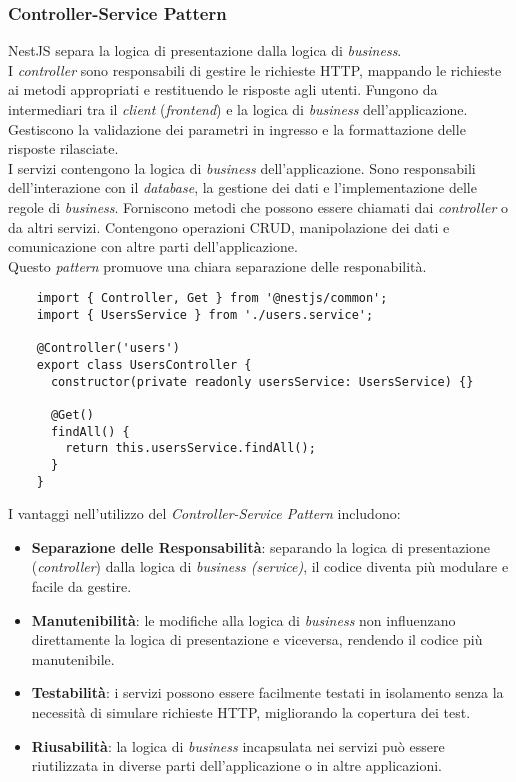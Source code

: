 \subsubsection{Controller-Service Pattern}
NestJS separa la logica di presentazione dalla logica di \textit{business}. \\
I \textit{controller} sono responsabili di gestire le richieste HTTP, mappando le richieste ai metodi appropriati e restituendo le risposte agli utenti.
Fungono da intermediari tra il \textit{client} (\textit{frontend}) e la logica di \textit{business} dell'applicazione.
Gestiscono la validazione dei parametri in ingresso e la formattazione delle risposte rilasciate.\\
I servizi contengono la logica di \textit{business} dell'applicazione. 
Sono responsabili dell'interazione con il \textit{database}, la gestione dei dati e l'implementazione delle regole di \textit{business}.
Forniscono metodi che possono essere chiamati dai \textit{controller} o da altri servizi.
Contengono operazioni CRUD, manipolazione dei dati e comunicazione con altre parti dell'applicazione.\\
Questo \textit{pattern} promuove una chiara separazione delle responabilità.
\begin{lstlisting}
	import { Controller, Get } from '@nestjs/common';
	import { UsersService } from './users.service';
	
	@Controller('users')
	export class UsersController {
	  constructor(private readonly usersService: UsersService) {}
	
	  @Get()
	  findAll() {
		return this.usersService.findAll();
	  }
	}
\end{lstlisting}
I vantaggi nell'utilizzo del \textit{Controller-Service Pattern} includono:
\begin{itemize}
	\item \textbf{Separazione delle Responsabilità}: separando la logica di presentazione (\textit{controller}) dalla logica di \textit{business (service)}, il codice diventa più modulare e facile da gestire.
	\item \textbf{Manutenibilità}: le modifiche alla logica di \textit{business} non influenzano direttamente la logica di presentazione e viceversa, rendendo il codice più manutenibile.
	\item \textbf{Testabilità}: i servizi possono essere facilmente testati in isolamento senza la necessità di simulare richieste HTTP, migliorando la copertura dei test.
	\item \textbf{Riusabilità}: la logica di \textit{business} incapsulata nei servizi può essere riutilizzata in diverse parti dell'applicazione o in altre applicazioni.
\end{itemize}


